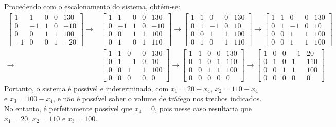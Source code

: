 \documentclass[12pt,a4paper]{article}
\begin{document}
\begin{ExerciseList}
Procedendo com o escalonamento do sistema, obtém-se:
{\footnotesize
\begin{align*}
\begin{bmatrix}
 1 &  1 & 0 & 0 & 130 \\
 0 & -1 & 1 & 0 & -10 \\
 0 &  0 & 1 & 1 & 100 \\
-1 &  0 & 0 & 1 & -20
\end{bmatrix}
\rightarrow
& \begin{bmatrix}
 1 &  1 & 0 & 0 & 130 \\
 0 & -1 & 1 & 0 & -10 \\
 0 &  0 & 1 & 1 & 100 \\
 0 &  1 & 0 & 1 & 110
\end{bmatrix}
\rightarrow
\begin{bmatrix}
 1 &  1 &  0 & 0 & 130 \\
 0 &  1 & -1 & 0 &  10 \\
 0 &  0 &  1 & 1 & 100 \\
 0 &  1 &  0 & 1 & 110
\end{bmatrix}
\rightarrow
\begin{bmatrix}
 1 &  1 &  0 & 0 & 130 \\
 0 &  1 & -1 & 0 &  10 \\
 0 &  0 &  1 & 1 & 100 \\
 0 &  0 &  1 & 1 & 100
\end{bmatrix} \\
\rightarrow
&\begin{bmatrix}
 1 &  1 &  0 & 0 & 130 \\
 0 &  1 & -1 & 0 &  10 \\
 0 &  0 &  1 & 1 & 100 \\
 0 &  0 &  0 & 0 &   0
\end{bmatrix}
\rightarrow
\begin{bmatrix}
 1 &  1 &  0 & 0 & 130 \\
 0 &  1 &  0 & 1 & 110 \\
 0 &  0 &  1 & 1 & 100 \\
 0 &  0 &  0 & 0 &   0
\end{bmatrix}
\rightarrow
\begin{bmatrix}
 1 &  0 &  0 & -1 & 20 \\
 0 &  1 &  0 &  1 & 110 \\
 0 &  0 &  1 &  1 & 100 \\
 0 &  0 &  0 &  0 &   0
\end{bmatrix}
\end{align*}
}
Portanto, o sistema é possível e indeterminado, com
$x_1 =  20 + x_4$,
$x_2 = 110 - x_4$ e
$x_3 = 100 - x_4$, e não é possível saber o volume de tráfego nos trechos indicados. No entanto, é perfeitamente possível que $x_4 = 0$, pois nesse caso resultaria que $x_1 = 20$, $x_2 = 110$ e $x_3 = 100$.


\end{ExerciseList}
\end{document}
